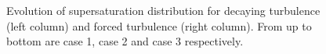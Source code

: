 \begin{figure}[H]\ContinuedFloat\centering
{}
\end{figure}

\begin{figure}[H]\ContinuedFloat\centering
{}
\caption{Evolution of supersaturation distribution for decaying turbulence
(left column) and forced turbulence (right column). From up to bottom are case
1, case 2 and case 3 respectively.}\label{fig:supersat_distri} \end{figure}

